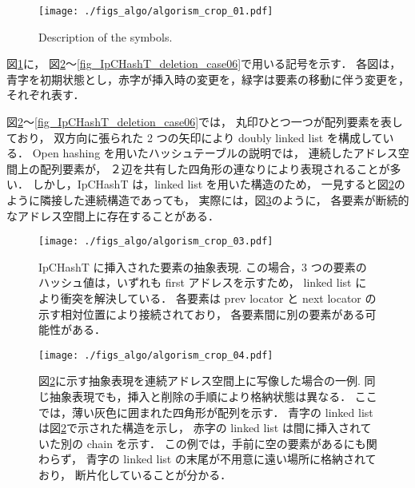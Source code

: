 \begin{figure}[h]
  \texttt{[image: ./figs\_algo/algorism\_crop\_01.pdf]}
  \caption{ Description of the symbols. }
  \label{fig_IpCHashT_fig_description}
\end{figure}

図\ref{fig_IpCHashT_fig_description}に，
図\ref{fig_IpCHashT_apparence}〜\ref{fig_IpCHashT_deletion_case06}で用いる記号を示す．
各図は，青字を初期状態とし，赤字が挿入時の変更を，緑字は要素の移動に伴う変更を，それぞれ表す．

図\ref{fig_IpCHashT_apparence}〜\ref{fig_IpCHashT_deletion_case06}では，
丸印ひとつ一つが配列要素を表しており，
双方向に張られた 2 つの矢印により doubly linked list を構成している．
Open hashing を用いたハッシュテーブルの説明では，
連続したアドレス空間上の配列要素が，
２辺を共有した四角形の連なりにより表現されることが多い．
しかし，IpCHashT は，linked list を用いた構造のため，
一見すると図\ref{fig_IpCHashT_apparence}のように隣接した連続構造であっても，
実際には，図\ref{fig_IpCHashT_insert_introspection}のように，
各要素が断続的なアドレス空間上に存在することがある．

\begin{figure}[h]
  \texttt{[image: ./figs\_algo/algorism\_crop\_03.pdf]}
  \caption{
    IpCHashT に挿入された要素の抽象表現.
    この場合，3 つの要素のハッシュ値は，いずれも first アドレスを示すため，
    linked list により衝突を解決している．
    各要素は prev locator と next locator の示す相対位置により接続されており，
    各要素間に別の要素がある可能性がある．
  }
  \label{fig_IpCHashT_apparence}
\end{figure}

\begin{figure}[h]
  \texttt{[image: ./figs\_algo/algorism\_crop\_04.pdf]}
  \caption{
    図\ref{fig_IpCHashT_apparence}に示す抽象表現を連続アドレス空間上に写像した場合の一例.
    同じ抽象表現でも，挿入と削除の手順により格納状態は異なる．
    ここでは，薄い灰色に囲まれた四角形が配列を示す．
    青字の linked list は図\ref{fig_IpCHashT_apparence}で示された構造を示し，
    赤字の linked list は間に挿入されていた別の chain を示す．
    この例では，手前に空の要素があるにも関わらず，
    青字の linked list の末尾が不用意に遠い場所に格納されており，
    断片化していることが分かる．
  }
  \label{fig_IpCHashT_insert_introspection}
\end{figure}

